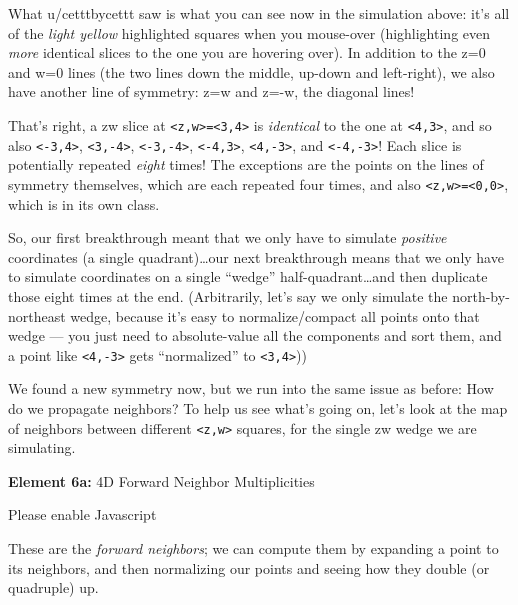 \documentclass[]{article}
\begin{document}
What u/cetttbycettt saw is what you can see now in the simulation above: it's
all of the \emph{light yellow} highlighted squares when you mouse-over
(highlighting even \emph{more} identical slices to the one you are hovering
over). In addition to the z=0 and w=0 lines (the two lines down the middle,
up-down and left-right), we also have another line of symmetry: z=w and z=-w,
the diagonal lines!

That's right, a zw slice at
\texttt{\textless{}z,w\textgreater{}=\textless{}3,4\textgreater{}} is
\emph{identical} to the one at \texttt{\textless{}4,3\textgreater{}}, and so
also \texttt{\textless{}-3,4\textgreater{}},
\texttt{\textless{}3,-4\textgreater{}}, \texttt{\textless{}-3,-4\textgreater{}},
\texttt{\textless{}-4,3\textgreater{}}, \texttt{\textless{}4,-3\textgreater{}},
and \texttt{\textless{}-4,-3\textgreater{}}! Each slice is potentially repeated
\emph{eight} times! The exceptions are the points on the lines of symmetry
themselves, which are each repeated four times, and also
\texttt{\textless{}z,w\textgreater{}=\textless{}0,0\textgreater{}}, which is in
its own class.

So, our first breakthrough meant that we only have to simulate \emph{positive}
coordinates (a single quadrant)\ldots our next breakthrough means that we only
have to simulate coordinates on a single ``wedge'' half-quadrant\ldots and then
duplicate those eight times at the end. (Arbitrarily, let's say we only simulate
the north-by-northeast wedge, because it's easy to normalize/compact all points
onto that wedge --- you just need to absolute-value all the components and sort
them, and a point like \texttt{\textless{}4,-3\textgreater{}} gets
``normalized'' to \texttt{\textless{}3,4\textgreater{}}))

We found a new symmetry now, but we run into the same issue as before: How do we
propagate neighbors? To help us see what's going on, let's look at the map of
neighbors between different \texttt{\textless{}z,w\textgreater{}} squares, for
the single zw wedge we are simulating.

\leavevmode\hypertarget{golSyms4DForward}{}%
\textbf{Element 6a:} 4D Forward Neighbor Multiplicities

\leavevmode\hypertarget{golSyms4DForwardCont}{}%
Please enable Javascript

These are the \emph{forward neighbors}; we can compute them by expanding a point
to its neighbors, and then normalizing our points and seeing how they double (or
quadruple) up.
\end{document}
